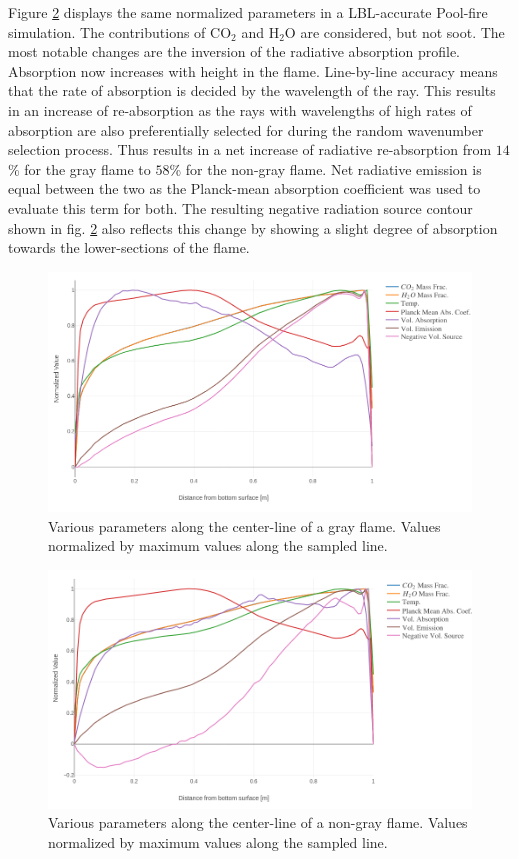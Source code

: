 Figure \ref{fig:PoolFire_lineplot_nongray} displays the same normalized parameters in a LBL-accurate Pool-fire simulation. The contributions of CO$_2$ and H$_2$O are considered, but not soot.
The most notable changes are the inversion of the radiative absorption profile. Absorption now increases with height in the flame. Line-by-line accuracy means that the rate of absorption is decided by the wavelength of the ray.
This results in an increase of re-absorption as the rays with wavelengths of high rates of absorption are also preferentially selected for during the random wavenumber selection process. Thus results in a net increase of radiative re-absorption from $14$\% for the gray flame to $58$\% for the non-gray flame. Net radiative emission is equal between the two as the Planck-mean absorption coefficient was used to evaluate this term for both.
The resulting negative radiation source contour shown in fig. \ref{fig:PoolFire_lineplot_nongray} also reflects this change by showing a slight degree of absorption towards the lower-sections of the flame.

\begin{figure}[!ht]
\includegraphics[width=\linewidth]{figures/ch4/line_plot.png}
\caption{Various parameters along the center-line of a gray flame. Values normalized by maximum values along the sampled line.}
\label{fig:PoolFire_lineplot}
\end{figure}


\begin{figure}[!ht]
\includegraphics[width=\linewidth]{figures/ch4/line_plot_nongray.png}
\caption{Various parameters along the center-line of a non-gray flame. Values normalized by maximum values along the sampled line.}
\label{fig:PoolFire_lineplot_nongray}
\end{figure}

